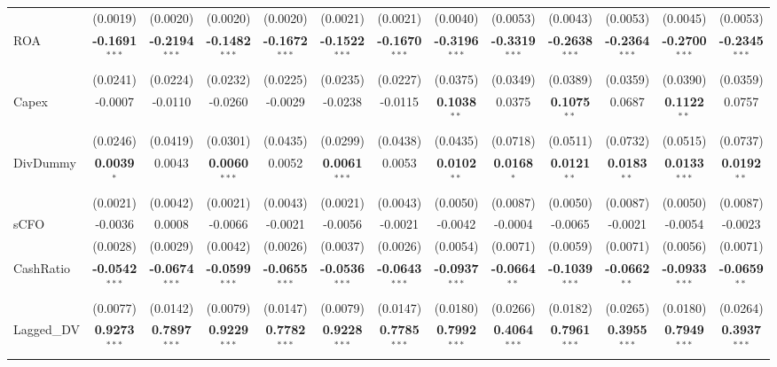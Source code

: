\documentclass[11pt,a4paper]{article}
\begin{document}
\begin{table}[htbp]
\begin{tabular}{lcccccccccccc}
 & (0.0019) & (0.0020) & (0.0020) & (0.0020) & (0.0021) & (0.0021) & (0.0040) & (0.0053) & (0.0043) & (0.0053) & (0.0045) & (0.0053) \\
ROA & \textbf{-0.1691}$^{***}$ & \textbf{-0.2194}$^{***}$ & \textbf{-0.1482}$^{***}$ & \textbf{-0.1672}$^{***}$ & \textbf{-0.1522}$^{***}$ & \textbf{-0.1670}$^{***}$ & \textbf{-0.3196}$^{***}$ & \textbf{-0.3319}$^{***}$ & \textbf{-0.2638}$^{***}$ & \textbf{-0.2364}$^{***}$ & \textbf{-0.2700}$^{***}$ & \textbf{-0.2345}$^{***}$ \\
 & (0.0241) & (0.0224) & (0.0232) & (0.0225) & (0.0235) & (0.0227) & (0.0375) & (0.0349) & (0.0389) & (0.0359) & (0.0390) & (0.0359) \\
Capex & -0.0007 & -0.0110 & -0.0260 & -0.0029 & -0.0238 & -0.0115 & \textbf{0.1038}$^{**}$ & 0.0375 & \textbf{0.1075}$^{**}$ & 0.0687 & \textbf{0.1122}$^{**}$ & 0.0757 \\
 & (0.0246) & (0.0419) & (0.0301) & (0.0435) & (0.0299) & (0.0438) & (0.0435) & (0.0718) & (0.0511) & (0.0732) & (0.0515) & (0.0737) \\
DivDummy & \textbf{0.0039}$^{*}$ & 0.0043 & \textbf{0.0060}$^{***}$ & 0.0052 & \textbf{0.0061}$^{***}$ & 0.0053 & \textbf{0.0102}$^{**}$ & \textbf{0.0168}$^{*}$ & \textbf{0.0121}$^{**}$ & \textbf{0.0183}$^{**}$ & \textbf{0.0133}$^{***}$ & \textbf{0.0192}$^{**}$ \\
 & (0.0021) & (0.0042) & (0.0021) & (0.0043) & (0.0021) & (0.0043) & (0.0050) & (0.0087) & (0.0050) & (0.0087) & (0.0050) & (0.0087) \\
sCFO & -0.0036 & 0.0008 & -0.0066 & -0.0021 & -0.0056 & -0.0021 & -0.0042 & -0.0004 & -0.0065 & -0.0021 & -0.0054 & -0.0023 \\
 & (0.0028) & (0.0029) & (0.0042) & (0.0026) & (0.0037) & (0.0026) & (0.0054) & (0.0071) & (0.0059) & (0.0071) & (0.0056) & (0.0071) \\
CashRatio & \textbf{-0.0542}$^{***}$ & \textbf{-0.0674}$^{***}$ & \textbf{-0.0599}$^{***}$ & \textbf{-0.0655}$^{***}$ & \textbf{-0.0536}$^{***}$ & \textbf{-0.0643}$^{***}$ & \textbf{-0.0937}$^{***}$ & \textbf{-0.0664}$^{**}$ & \textbf{-0.1039}$^{***}$ & \textbf{-0.0662}$^{**}$ & \textbf{-0.0933}$^{***}$ & \textbf{-0.0659}$^{**}$ \\
 & (0.0077) & (0.0142) & (0.0079) & (0.0147) & (0.0079) & (0.0147) & (0.0180) & (0.0266) & (0.0182) & (0.0265) & (0.0180) & (0.0264) \\
Lagged\_DV & \textbf{0.9273}$^{***}$ & \textbf{0.7897}$^{***}$ & \textbf{0.9229}$^{***}$ & \textbf{0.7782}$^{***}$ & \textbf{0.9228}$^{***}$ & \textbf{0.7785}$^{***}$ & \textbf{0.7992}$^{***}$ & \textbf{0.4064}$^{***}$ & \textbf{0.7961}$^{***}$ & \textbf{0.3955}$^{***}$ & \textbf{0.7949}$^{***}$ & \textbf{0.3937}$^{***}$ \\

\end{tabular}
\end{table}
\end{document}
